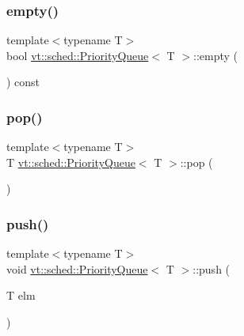 \subsubsection{\texorpdfstring{empty()}{empty()}}
{\footnotesize\ttfamily template$<$typename T$>$ \\
bool \hyperlink{structvt_1_1sched_1_1_priority_queue}{vt\+::sched\+::\+Priority\+Queue}$<$ T $>$\+::empty (\begin{DoxyParamCaption}{ }\end{DoxyParamCaption}) const\hspace{0.3cm}{\ttfamily [inline]}}

\mbox{\label{structvt_1_1sched_1_1_priority_queue_aec357e1233dcb2991105795640372f8a}} 
\subsubsection{\texorpdfstring{pop()}{pop()}}
{\footnotesize\ttfamily template$<$typename T$>$ \\
T \hyperlink{structvt_1_1sched_1_1_priority_queue}{vt\+::sched\+::\+Priority\+Queue}$<$ T $>$\+::pop (\begin{DoxyParamCaption}{ }\end{DoxyParamCaption})\hspace{0.3cm}{\ttfamily [inline]}}

\mbox{\label{structvt_1_1sched_1_1_priority_queue_af532279184e76da6c72a52664d6a9922}} 
\subsubsection{\texorpdfstring{push()}{push()}}
{\footnotesize\ttfamily template$<$typename T$>$ \\
void \hyperlink{structvt_1_1sched_1_1_priority_queue}{vt\+::sched\+::\+Priority\+Queue}$<$ T $>$\+::push (\begin{DoxyParamCaption}\item[{T}]{elm }\end{DoxyParamCaption})\hspace{0.3cm}{\ttfamily [inline]}}

